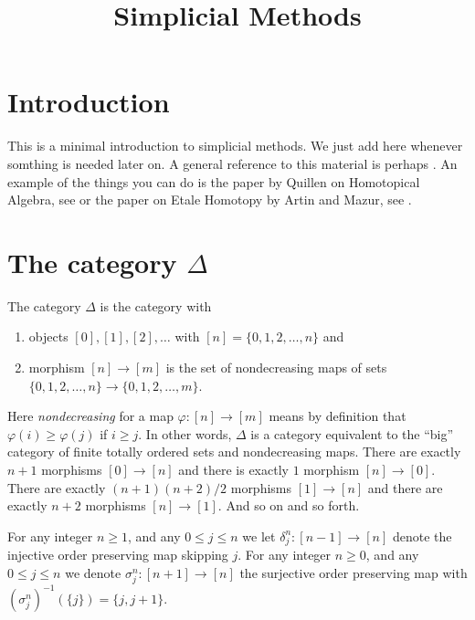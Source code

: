 

%


\title{Simplicial Methods}


\maketitle

\tableofcontents

\section{Introduction}
\label{section-introduction}

\noindent
This is a minimal introduction to simplicial methods.
We just add here whenever somthing is needed later on.
A general reference to this material is perhaps \cite{SimpHom}.
An example of the things you can do is the paper
by Quillen on Homotopical Algebra, see \cite{Quillen}
or the paper on Etale Homotopy by Artin and Mazur, see \cite{ArtinMazur}.

\section{The category $\Delta$}
\label{section-Delta}

\noindent
The category $\Delta$ is the category with
\begin{enumerate}
\item objects $[0], [1], [2], \ldots$ with
$[n] = \{0, 1, 2, \ldots, n\}$ and
\item morphism $[n] \to [m]$ is the set of nondecreasing
maps of sets $\{0, 1, 2, \ldots, n\} \to \{0, 1, 2, \ldots, m\}$.
\end{enumerate}
Here {\it nondecreasing} for a map $\varphi : [n] \to [m]$
means by definition that $\varphi(i) \geq \varphi(j)$ if $i \geq j$.
In other words, $\Delta$ is a category equivalent to the
``big'' category of finite totally ordered sets and nondecreasing maps.
There are exactly $n + 1$ morphisms $[0] \to [n]$ and
there is exactly $1$ morphism $[n] \to [0]$. There are
exactly $(n + 1)(n + 2)/2$ morphisms $[1] \to [n]$ and there are
exactly $n + 2$ morphisms $[n] \to [1]$. And so on and so forth.

\begin{definition}
\label{definition-face-degeneracy}
For any integer $n\geq 1$, and any $0\leq j \leq n$ we let $\delta^n_j : [n-1]
\to [n]$ denote the injective order preserving map skipping $j$. For any
integer $n\geq 0$, and any $0\leq j \leq n$ we denote $\sigma^n_j : [n+1] 
\to [n]$ the surjective order preserving map with 
$(\sigma^n_j)^{-1}(\{j\}) = \{j, j+1\}$.
\end{definition}

